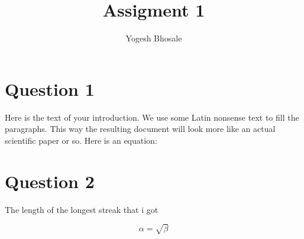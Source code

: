 \documentclass{article}
\begin{document}
\title{Assigment 1}
\author{Yogesh Bhosale}

\maketitle



\section{Question 1}

Here is the text of your introduction. We use some Latin nonsense text to fill
the paragraphs. This way the resulting document will look more like an actual
scientific paper or so. Here is an equation:

\section{Question 2}
The length of the longest streak that i got 

\begin{equation}
    \label{simple_equation}
    \alpha = \sqrt{ \beta }
\end{equation}
\end{document}
